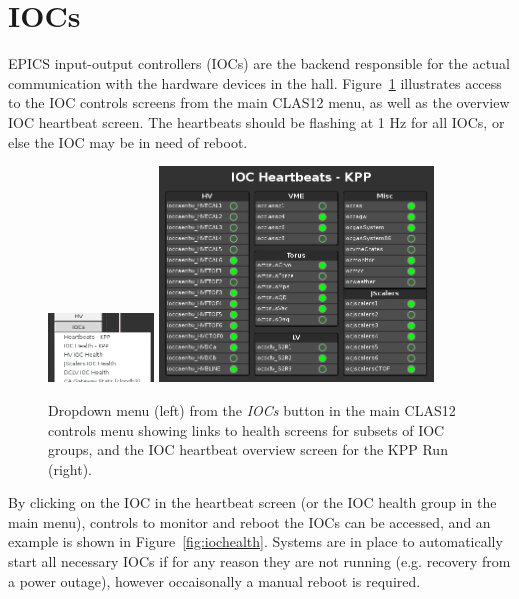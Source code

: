 \documentclass[amsmath,amssymb,notitlepage,11pt]{revtex4}
\begin{document}
\clearpage

\section{IOCs}
EPICS input-output controllers (IOCs) are the backend responsible for the actual communication with the hardware devices in the hall.  Figure~\ref{fig:iocmenu} illustrates access to the IOC controls screens from the main CLAS12 menu, as well as the overview IOC heartbeat screen.  The heartbeats should be flashing at 1 Hz for all IOCs, or else the IOC may be in need of reboot.  

\begin{figure}[htbp]\centering
  \includegraphics[width=0.25\textwidth]{pics/iocmenu-KPP}
  \includegraphics[width=0.65\textwidth]{pics/iocbeats-KPP}
  \caption{Dropdown menu (left) from the {\em IOCs} button in the main CLAS12 controls menu showing links to health screens for subsets of IOC groups, and the IOC heartbeat overview screen for the KPP Run (right).\label{fig:iocmenu}}
\end{figure}

By clicking on the IOC in the heartbeat screen (or the IOC health group in the main menu), controls to monitor and reboot the IOCs can be accessed, and an example is shown in Figure~\ref{fig:iochealth}.  Systems are in place to automatically start all necessary IOCs if for any reason they are not running (e.g. recovery from a power outage), however occaisonally a manual reboot is required.
\end{document}
